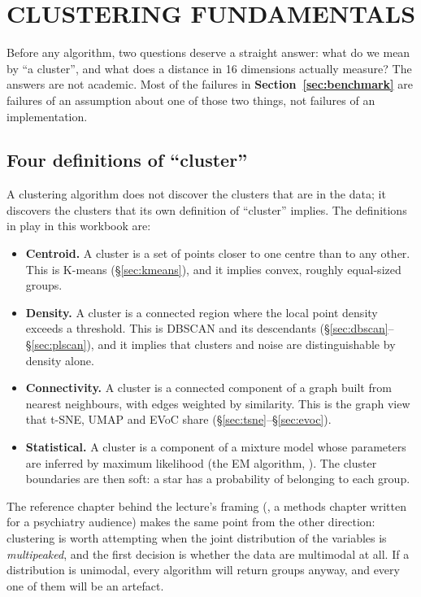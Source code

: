 \section{CLUSTERING FUNDAMENTALS}
\label{sec:fundamentals}


Before any algorithm, two questions deserve a straight answer: what do we
mean by ``a cluster'', and what does a distance in 16 dimensions actually
measure? The answers are not academic. Most of the failures in
\textbf{Section~\ref{sec:benchmark}} are failures of an assumption about one
of those two things, not failures of an implementation.

\subsection{Four definitions of ``cluster''}

A clustering algorithm does not discover the clusters that are in the data;
it discovers the clusters that its own definition of ``cluster'' implies. The
definitions in play in this workbook are:

\begin{itemize}
\item \textbf{Centroid.} A cluster is a set of points closer to one centre
  than to any other. This is K-means (\S\ref{sec:kmeans}), and it implies
  convex, roughly equal-sized groups.
\item \textbf{Density.} A cluster is a connected region where the local point
  density exceeds a threshold. This is DBSCAN and its descendants
  (\S\ref{sec:dbscan}--\S\ref{sec:plscan}), and it implies that clusters and
  noise are distinguishable by density alone.
\item \textbf{Connectivity.} A cluster is a connected component of a graph
  built from nearest neighbours, with edges weighted by similarity. This is
  the graph view that t-SNE, UMAP and EVoC share
  (\S\ref{sec:tsne}--\S\ref{sec:evoc}).
\item \textbf{Statistical.} A cluster is a component of a mixture model whose
  parameters are inferred by maximum likelihood (the EM algorithm,
  \citealp{Dempster:77}). The cluster boundaries are then soft: a star has a
  probability of belonging to each group.
\end{itemize}

The reference chapter behind the lecture's framing (\citet{GarciaDias:20}, a
methods chapter written for a psychiatry audience) makes the same point from
the other direction: clustering is worth attempting when the joint distribution
of the variables is \emph{multipeaked}, and the first decision is whether the
data are multimodal at all. If a distribution is unimodal, every algorithm will
return groups anyway, and every one of them will be an artefact.


